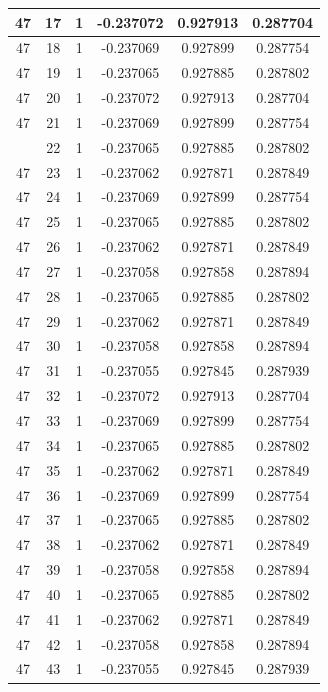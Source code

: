 \documentclass[12pt,a4paper]{article}
\numberwithin{equation}{section}
\numberwithin{figure}{section}
\numberwithin{table}{section}
\begin{document}
\begin{longtable}{|c|c|c|c|c|c|}
47 & 17 & 1 & -0.237072 & 0.927913 & 0.287704 \\ \hline
47 & 18 & 1 & -0.237069 & 0.927899 & 0.287754 \\ \hline
47 & 19 & 1 & -0.237065 & 0.927885 & 0.287802 \\ \hline
47 & 20 & 1 & -0.237072 & 0.927913 & 0.287704 \\ \hline
47 & 21 & 1 & -0.237069 & 0.927899 & 0.287754 \\ \hline
\pagebreak
47 & 22 & 1 & -0.237065 & 0.927885 & 0.287802 \\ \hline
47 & 23 & 1 & -0.237062 & 0.927871 & 0.287849 \\ \hline
47 & 24 & 1 & -0.237069 & 0.927899 & 0.287754 \\ \hline
47 & 25 & 1 & -0.237065 & 0.927885 & 0.287802 \\ \hline
47 & 26 & 1 & -0.237062 & 0.927871 & 0.287849 \\ \hline
47 & 27 & 1 & -0.237058 & 0.927858 & 0.287894 \\ \hline
47 & 28 & 1 & -0.237065 & 0.927885 & 0.287802 \\ \hline
47 & 29 & 1 & -0.237062 & 0.927871 & 0.287849 \\ \hline
47 & 30 & 1 & -0.237058 & 0.927858 & 0.287894 \\ \hline
47 & 31 & 1 & -0.237055 & 0.927845 & 0.287939 \\ \hline
47 & 32 & 1 & -0.237072 & 0.927913 & 0.287704 \\ \hline
47 & 33 & 1 & -0.237069 & 0.927899 & 0.287754 \\ \hline
47 & 34 & 1 & -0.237065 & 0.927885 & 0.287802 \\ \hline
47 & 35 & 1 & -0.237062 & 0.927871 & 0.287849 \\ \hline
47 & 36 & 1 & -0.237069 & 0.927899 & 0.287754 \\ \hline
47 & 37 & 1 & -0.237065 & 0.927885 & 0.287802 \\ \hline
47 & 38 & 1 & -0.237062 & 0.927871 & 0.287849 \\ \hline
47 & 39 & 1 & -0.237058 & 0.927858 & 0.287894 \\ \hline
47 & 40 & 1 & -0.237065 & 0.927885 & 0.287802 \\ \hline
47 & 41 & 1 & -0.237062 & 0.927871 & 0.287849 \\ \hline
47 & 42 & 1 & -0.237058 & 0.927858 & 0.287894 \\ \hline
47 & 43 & 1 & -0.237055 & 0.927845 & 0.287939 \\ \hline

\end{longtable}
\end{document}
